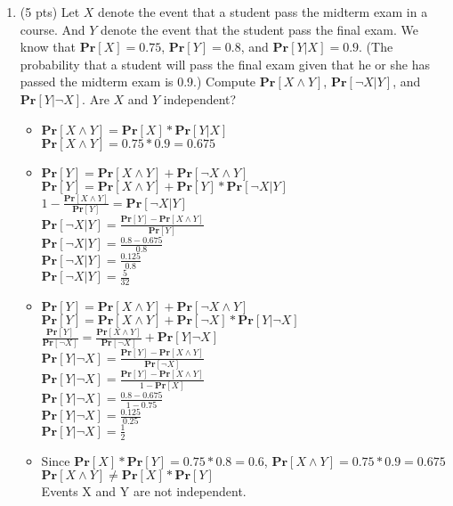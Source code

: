 \documentclass[11pt]{article}
\renewcommand{\Pr}{\ensuremath{\mathbf{Pr}}\xspace}
\begin{document}
\begin{description}
\begin{enumerate}
\begin{enumerate}
\end{enumerate}

 \item (5 pts)
Let $X$ denote the event that a student pass the midterm exam in a course.  And $Y$ denote the event that the student pass the final exam.  We know that $\Pr[X]=0.75$, $\Pr[Y]=0.8$, and $\Pr[Y|X]=0.9$.  (The probability that a student will pass the final exam given that he or she has passed the midterm exam is 0.9.)  Compute $\Pr[X\wedge Y]$, $\Pr[\neg X | Y]$, and $\Pr[Y | \neg X]$. Are $X$ and $Y$ independent? 
	\begin{itemize}
	\item
	$\Pr[X \wedge Y] = \Pr[X] * \Pr[Y | X]$ \\
	$\Pr[X \wedge Y] = 0.75 * 0.9 = 0.675$ \\
	\item
	$\Pr[Y] = \Pr[X \wedge Y] + \Pr[\neg X \wedge Y]$ \\
	$\Pr[Y] = \Pr[X \wedge Y] + \Pr[Y] * \Pr[\neg X | Y] $ \\
	$1 - \frac{\Pr[ X \wedge Y]}{\Pr[Y]} = \Pr[\neg X | Y]$ \\
	$\Pr[\neg X | Y] = \frac{\Pr[Y] - \Pr[X \wedge Y]}{\Pr[Y]}$ \\
	$\Pr[\neg X | Y] = \frac{0.8 - 0.675}{0.8}$ \\
	$\Pr[\neg X | Y] = \frac{0.125}{0.8}$ \\
	$\Pr[\neg X | Y] = \frac{5}{32} $ \\
	\item
	$\Pr[Y] = \Pr[X \wedge Y] + \Pr[\neg X \wedge Y]$ \\
	$\Pr[Y] = \Pr[X \wedge Y] + \Pr[\neg X] * \Pr[Y | \neg X] $ \\
	$\frac{\Pr[Y]}{\Pr[\neg X]} = \frac{\Pr[X \wedge Y]}{\Pr[\neg X]} + \Pr[Y | \neg X]$ \\
	$\Pr[Y | \neg X] = \frac{\Pr[Y] - \Pr[X \wedge Y] }{\Pr[\neg X]}$ \\
	$\Pr[Y | \neg X] = \frac{\Pr[Y] - \Pr[X \wedge Y] }{1 - \Pr[X]}$ \\
	$\Pr[Y | \neg X] = \frac{0.8 - 0.675}{1 - 0.75}$ \\
	$\Pr[Y | \neg X] = \frac{0.125}{0.25}$ \\
	$\Pr[Y | \neg X] = \frac{1}{2} $ \\
	\item
	Since $\Pr[X] * \Pr[Y] = 0.75 * 0.8 = 0.6$, $\Pr[X \wedge Y] = 0.75 * 0.9 = 0.675$ \\
	$\Pr[X \wedge Y] \neq \Pr[X] * \Pr[Y]$ \\
	Events X and Y are not independent. \\
	\end{itemize}


\end{enumerate}
\end{description}
\end{document}
